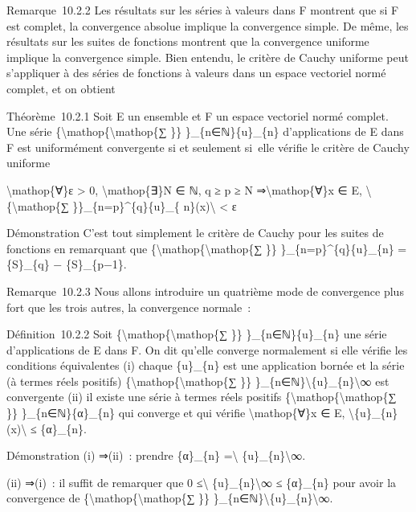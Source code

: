 \documentclass[]{article}
\begin{document}
Remarque~10.2.2 Les résultats sur les séries à valeurs dans F montrent
que si F est complet, la convergence absolue implique la convergence
simple. De même, les résultats sur les suites de fonctions montrent que
la convergence uniforme implique la convergence simple. Bien entendu, le
critère de Cauchy uniforme peut s'appliquer à des séries de fonctions à
valeurs dans un espace vectoriel normé complet, et on obtient

Théorème~10.2.1 Soit E un ensemble et F un espace vectoriel normé
complet. Une série \{\textbackslash{}mathop\{\textbackslash{}mathop\{∑
\}\} \}\_\{n∈ℕ\}\{u\}\_\{n\} d'applications de E dans F est uniformément
convergente si et seulement si~elle vérifie le critère de Cauchy
uniforme

\textbackslash{}mathop\{∀\}ε \textgreater{} 0,
\textbackslash{}mathop\{∃\}N ∈ ℕ, q ≥ p ≥ N
⇒\textbackslash{}mathop\{∀\}x ∈ E,
\textbackslash{}\textbar{}\{\textbackslash{}mathop\{∑
\}\}\_\{n=p\}\^{}\{q\}\{u\}\_\{ n\}(x)\textbackslash{}\textbar{}
\textless{} ε

Démonstration C'est tout simplement le critère de Cauchy pour les suites
de fonctions en remarquant que
\{\textbackslash{}mathop\{\textbackslash{}mathop\{∑ \}\}
\}\_\{n=p\}\^{}\{q\}\{u\}\_\{n\} = \{S\}\_\{q\} − \{S\}\_\{p−1\}.

Remarque~10.2.3 Nous allons introduire un quatrième mode de convergence
plus fort que les trois autres, la convergence normale~:

Définition~10.2.2 Soit
\{\textbackslash{}mathop\{\textbackslash{}mathop\{∑ \}\}
\}\_\{n∈ℕ\}\{u\}\_\{n\} une série d'applications de E dans F. On dit
qu'elle converge normalement si elle vérifie les conditions équivalentes
(i) chaque \{u\}\_\{n\} est une application bornée et la série (à termes
réels positifs) \{\textbackslash{}mathop\{\textbackslash{}mathop\{∑ \}\}
\}\_\{n∈ℕ\}\textbackslash{}\textbar{}\{u\}\_\{n\}\textbackslash{}\textbar{}∞
est convergente (ii) il existe une série à termes réels positifs
\{\textbackslash{}mathop\{\textbackslash{}mathop\{∑ \}\}
\}\_\{n∈ℕ\}\{α\}\_\{n\} qui converge et qui vérifie
\textbackslash{}mathop\{∀\}x ∈ E,
\textbackslash{}\textbar{}\{u\}\_\{n\}(x)\textbackslash{}\textbar{} ≤
\{α\}\_\{n\}.

Démonstration (i) ⇒(ii)~: prendre \{α\}\_\{n\}
=\textbackslash{}\textbar{} \{u\}\_\{n\}\textbackslash{}\textbar{}∞.

(ii) ⇒(i)~: il suffit de remarquer que 0 ≤\textbackslash{}\textbar{}
\{u\}\_\{n\}\textbackslash{}\textbar{}∞ ≤ \{α\}\_\{n\} pour avoir la
convergence de \{\textbackslash{}mathop\{\textbackslash{}mathop\{∑ \}\}
\}\_\{n∈ℕ\}\textbackslash{}\textbar{}\{u\}\_\{n\}\textbackslash{}\textbar{}∞.
\end{document}
